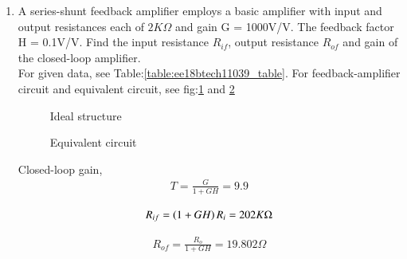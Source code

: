 \begin{enumerate}[label=\thesubsection.\arabic*.,ref=\thesubsection.\theenumi]

    \item A series-shunt feedback amplifier employs a basic amplifier with input and output resistances each of $2K\Omega$ and
    gain G = 1000V/V. The feedback factor H = 0.1V/V. Find the input resistance $R_{if}$, output resistance $R_{of}$ and gain 
    of the closed-loop amplifier. \\
    
\solution 
For given data, see Table:\ref{table:ee18btech11039_table}.
For feedback-amplifier circuit and equivalent circuit, see fig:\ref{fig:ee18btech11039_fig1} and \ref{fig:ee18btech11039_fig2}

\begin{table}[!h]
\centering

\caption{}
\label{table:ee18btech11039_table}
\end{table}

\begin{figure}[!htb]
		\resizebox{\columnwidth}{!}{}
\caption{Ideal structure}
\label{fig:ee18btech11039_fig1}
\end{figure}

\begin{figure}[!htb]
		\resizebox{\columnwidth}{!}{}
\caption{Equivalent circuit}
\label{fig:ee18btech11039_fig2}
\end{figure}

Closed-loop gain,
\begin{align}
    T = \frac{G}{1+GH}
      = 9.9
\end{align}

\begin{align}
    R_{if} = \left(1+GH\right) R_i
    = 202K\Omega
\end{align}

\begin{align}
    R_{of} = \frac{R_o}{1+GH}
           = 19.802\Omega
\end{align}
\end{enumerate}
